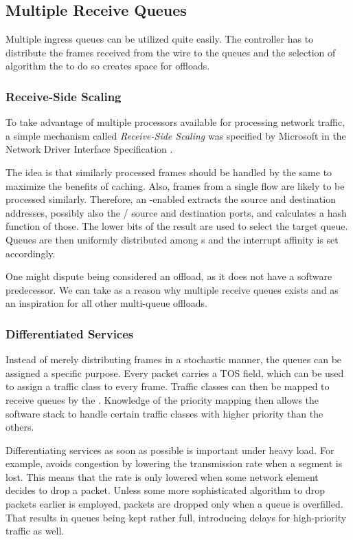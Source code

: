\subsection{Multiple Receive Queues}

Multiple ingress queues can be utilized quite
easily. The controller has to distribute the frames received from the wire to
the queues and the selection of algorithm the to do so creates space for offloads.

\subsubsection{Receive-Side Scaling}

To take advantage of multiple processors available for processing
network traffic, a simple mechanism called \emph{Receive-Side Scaling} was
specified by Microsoft in the Network Driver Interface Specification \cite{NDIS}.

The idea is that similarly processed frames should be handled by the same
 to maximize the benefits of caching. Also, frames from a single flow are
likely to be processed similarly. Therefore, an -enabled 
extracts the source and destination addresses, possibly also the /
source and destination ports, and calculates a hash function of those. The lower
bits of the result are used to select the target queue. Queues are then uniformly
distributed among s and the interrupt affinity is set accordingly.

One might dispute  being considered an offload, as it does not have a
software predecessor. We can take  as a reason why multiple receive queues
exists and as an inspiration for all other multi-queue offloads.

\subsubsection{Differentiated Services}

Instead of merely distributing frames in a stochastic manner, the queues can be
assigned a specific purpose. Every  packet carries a \acrfull{TOS} field,
which can be used to assign a traffic class to every frame. Traffic classes can
then be mapped to receive queues by the . Knowledge of the priority
mapping then allows the software stack to handle certain traffic classes with higher
priority than the others.

Differentiating services as soon as possible is important under heavy load. For
example,  avoids congestion by lowering the transmission rate when a segment is lost.
This means that the rate is only lowered when some network element decides to drop
a packet. Unless some more sophisticated algorithm to drop packets earlier is
employed, packets are dropped only when a queue is overfilled. That results in
queues being kept rather full, introducing delays for high-priority traffic as
well.

